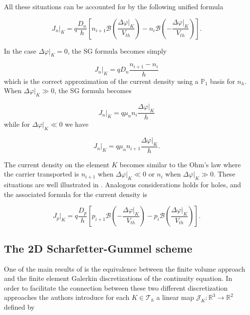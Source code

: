 All these situations can be accounted for by the following unified formula

 \begin{equation}
\label{eq: scharfetter gummel 1D electron}
J_n|_K=q\frac{D_n}{h}
\left[ n_{i+1}\mathcal{B}\left(\frac{\Delta \varphi|_K}{V_{th}}\right)- n_i\mathcal{B}\left(-\frac{\Delta \varphi|_K}{V_{th}}\right)\right].  
\end{equation}

In the case $\Delta \varphi|_K=0$, the SG formula becomes simply

\begin{equation}
J_n|_K=qD_n\frac{n_{i+1}-n_{i}}{h}
\end{equation}
which is the correct approximation of the current density using a $\mathbb{P}_1$ basis for $n_h$. When $\Delta \varphi|_K \gg 0$, the SG formula becomes

\begin{equation}
J_n|_K = q\mu_n n_{i}\dfrac{\Delta \varphi|_K}{h}
\end{equation}
while for $\Delta \varphi|_K \ll 0$ we have

\begin{equation}
J_n|_K = q\mu_n n_{i+1}\dfrac{\Delta \varphi|_K}{h}.
\end{equation}

The current density on the element $K$ becomes similar to the Ohm's law where the carrier transported is $n_{i+1}$ when $\Delta \varphi|_K \ll 0$ or $n_i$ when $\Delta \varphi|_K \gg 0$. These situations are well illustrated in .
Analogous considerations holds for holes, and the associated formula for the current density is

 \begin{equation}
\label{eq: scharfetter gummel 1D hole}
J_p|_K=q\frac{D_p}{h}
\left[ p_{i+1}\mathcal{B}\left(-\frac{\Delta \varphi|_K}{V_{th}}\right)- p_i\mathcal{B}\left(\frac{\Delta \varphi|_K}{V_{th}}\right)\right].  
\end{equation}


\subsection{The 2D Scharfetter-Gummel scheme}

One of the main results of \cite{Bank:FEvsBOX} is the equivalence between the finite volume approach and the finite element Galerkin discretizations of the continuity equation. In order to facilitate the connection between these two different discretization approaches the authors introduce for each $K \in \mathcal{T}_h$ a linear map $\mathcal{J}_{K}:\mathbb{R}^3\rightarrow\mathbb{R}^2$ defined by

